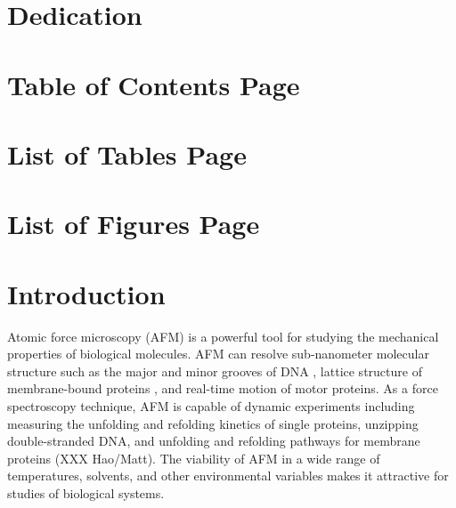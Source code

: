 \documentclass[%
  aip,12pt,tightenlines,
  amsthm,
 amsmath,amssymb
]{article}
\newcommand{\sLabel}[1]{\label{section:#1}}
\newcommand{\firstp}[0]{}
\newcommand{\pl}[0]{\vspace{6pt}}
\newcommand{\citePRH}[1]{\cite{#1}}
\begin{document}
\clearpage

\section{Dedication}

\clearpage

\section{Table of Contents Page}

\tableofcontents

\clearpage

\section{List of Tables Page}

\listoftables

\clearpage

\section{List of Figures Page}

\listoffigures
 
\clearpage


\maketitle

\doublespacing

\section{\sLabel{Intro}Introduction}

\firstp Atomic force microscopy (AFM) is a powerful tool for studying the mechanical properties of biological molecules.  AFM can resolve sub-nanometer molecular structure such as the major and minor grooves of DNA \citePRH{ido_beyond_2013}, lattice structure of membrane-bound proteins \citePRH{muller_surface_1999}, and real-time motion of motor proteins\citePRH{ando_high-speed_2007}. As a force spectroscopy technique, AFM is capable of dynamic experiments including measuring the unfolding and refolding kinetics of single proteins\citePRH{he_direct_2015}, unzipping double-stranded DNA\citePRH{krautbauer_Unzipping_2003}, and unfolding and refolding pathways for membrane proteins (XXX Hao/Matt). The viability of AFM in a wide range of temperatures, solvents, and other environmental variables makes it attractive for studies of biological systems. \pl
\end{document}
